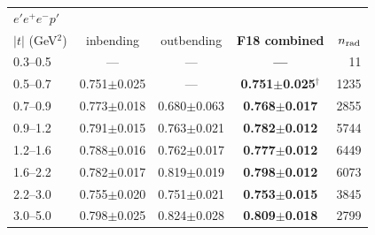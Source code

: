 \begin{tabular}{lcccr}\toprule
\multicolumn{5}{l}{$e'e^+e^-p'$}\\
$|t|$ (GeV$^2$) & inbending & outbending & \textbf{F18 combined} & $n_{\rm rad}$ \\\midrule
0.3--0.5 & --- & --- & \textbf{---} & 11 \\
0.5--0.7 & 0.751$\pm$0.025 & --- & \textbf{0.751$\pm$0.025$^\dagger$} & 1235 \\
0.7--0.9 & 0.773$\pm$0.018 & 0.680$\pm$0.063 & \textbf{0.768$\pm$0.017} & 2855 \\
0.9--1.2 & 0.791$\pm$0.015 & 0.763$\pm$0.021 & \textbf{0.782$\pm$0.012} & 5744 \\
1.2--1.6 & 0.788$\pm$0.016 & 0.762$\pm$0.017 & \textbf{0.777$\pm$0.012} & 6449 \\
1.6--2.2 & 0.782$\pm$0.017 & 0.819$\pm$0.019 & \textbf{0.798$\pm$0.012} & 6073 \\
2.2--3.0 & 0.755$\pm$0.020 & 0.751$\pm$0.021 & \textbf{0.753$\pm$0.015} & 3845 \\
3.0--5.0 & 0.798$\pm$0.025 & 0.824$\pm$0.028 & \textbf{0.809$\pm$0.018} & 2799 \\
\bottomrule\end{tabular}

\medskip

